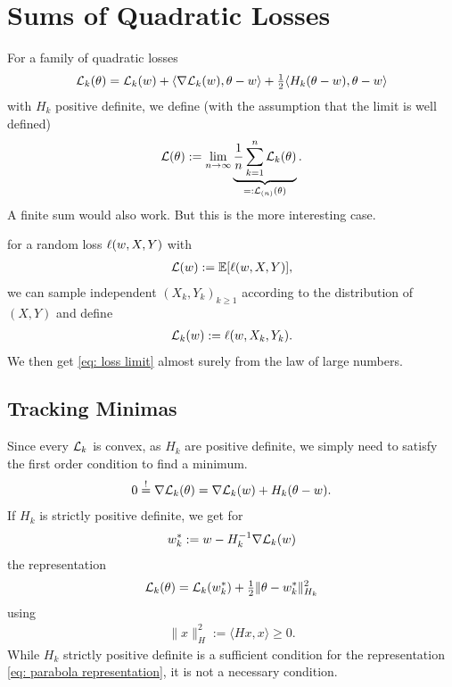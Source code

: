 \section{Sums of Quadratic Losses}

For a family of quadratic losses
\begin{align*}
	\mathcal{L}_k(\theta)
	= \mathcal{L}_k(w)
	+ \langle\nabla\mathcal{L}_k(w), \theta-w\rangle
	+ \tfrac12\langle H_k(\theta-w), \theta-w\rangle
\end{align*}
with \(H_k\) positive definite, we define (with the assumption that the
limit is well defined)
\begin{align}\label{eq: loss limit}
	\mathcal{L}(\theta) := \lim_{n\to\infty} \underbrace{\frac1n\sum_{k=1}^n \mathcal{L}_k(\theta)}_{=: \mathcal{L}_{(n)}(\theta)}.
\end{align}
A finite sum would also work. But this is the more interesting case.
\begin{example}
	for a random loss \(\ell(w, X,Y)\) with
	\begin{align*}
		\mathcal{L}(w) := \mathbb{E}[\ell(w, X,Y)],
	\end{align*}
	we can sample independent \((X_k,Y_k)_{k\ge 1}\) according to the distribution of
	\((X,Y)\) and define
	\begin{align*}
		\mathcal{L}_k(w) := \ell(w, X_k, Y_k).
	\end{align*}
	We then get \eqref{eq: loss limit} almost surely from the law of large numbers.
\end{example}

\subsection{Tracking Minimas}

Since every \(\mathcal{L}_k\) is convex, as \(H_k\) are positive definite, we
simply need to satisfy the first order condition to find a minimum.
\begin{align*}
	0\overset!= \nabla\mathcal{L}_k(\theta)
	= \nabla\mathcal{L}_k(w) + H_k(\theta-w).
\end{align*}
If \(H_k\) is strictly positive definite, we get for
\begin{align*}
	w^*_k := w - H_k^{-1}\nabla\mathcal{L}_k(w)
\end{align*}
the representation
\begin{align}\label{eq: parabola representation}
	\mathcal{L}_k(\theta) = \mathcal{L}_k(w^*_k) + \tfrac12 \|\theta-w^*_k\|_{H_k}^2
\end{align}
using
\begin{align*}
	\|x\|_H^2 := \langle Hx, x\rangle\ge 0.
\end{align*}
While \(H_k\) strictly positive definite is a sufficient condition for the
representation \eqref{eq: parabola representation}, it is not a necessary
condition.

